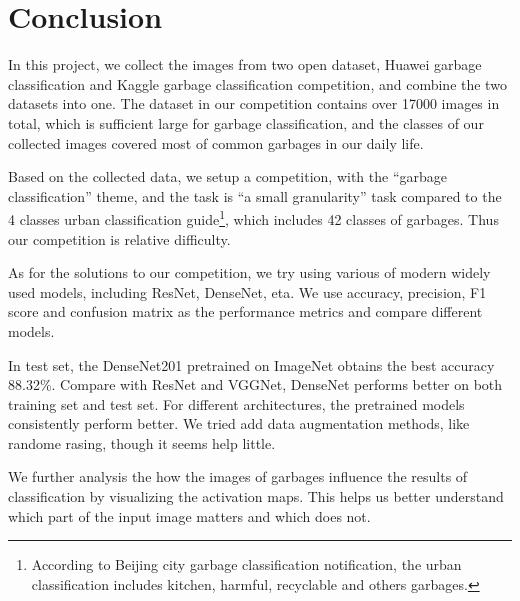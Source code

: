 \section{Conclusion}
In this project, we collect the images from two open dataset, Huawei garbage classification and Kaggle garbage classification competition, and combine the two datasets into one.
The dataset in our competition contains over 17000 images in total, which is sufficient large for garbage classification, and the classes of our collected images covered most of 
common garbages in our daily life.

Based on the collected data, we setup a competition, with the ``garbage classification'' theme, and the task is ``a small granularity'' task compared to the 4 classes urban classification guide\footnote{According to Beijing city garbage classification notification, the urban classification includes kitchen, harmful, recyclable and others garbages.}, 
which includes 42 classes of garbages. Thus our competition is 
relative difficulty.

As for the solutions to our competition, we try using various of modern widely used models, including ResNet, DenseNet, eta. We use accuracy, precision, F1 score and confusion matrix as the performance metrics
and compare different models.

In test set, the DenseNet201 pretrained on ImageNet obtains the best accuracy 88.32\%. Compare with ResNet and VGGNet, DenseNet performs better on both 
training set and test set. For different architectures, the pretrained models consistently perform better.
We tried add data augmentation methods, like randome rasing, though it seems help little.

We further analysis the how the images of garbages influence the results of classification by visualizing the activation maps. This helps us better understand which part of the input image matters and which does not.
